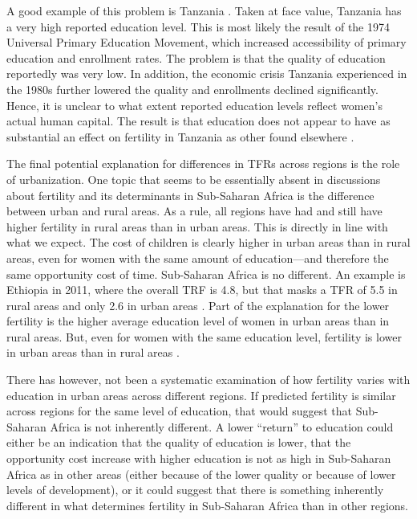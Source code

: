 \documentclass[letterpaper,12pt]{article}
\begin{document}
A good example of this problem is Tanzania
\citep{Galabawa2001,Wedgwood2005}. 
Taken at face value, Tanzania has a very high reported education level. 
This is most likely the result of the 1974 Universal Primary Education
Movement, which increased accessibility of primary education and
enrollment rates. 
The problem is that the quality of education reportedly was very low. 
In addition, the economic crisis Tanzania experienced in the 1980s
further lowered the quality and enrollments declined significantly. 
Hence, it is unclear to what extent reported education levels reflect
women's actual human capital. 
The result is that education does not appear to have as substantial an
effect on fertility in Tanzania as other found elsewhere
\citep{Alam2016}.

The final potential explanation for differences in TFRs across regions
is the role of urbanization. 
One topic that seems to be essentially absent in discussions about
fertility and its determinants in Sub-Saharan Africa is the difference
between urban and rural areas. 
As a rule, all regions have had and still have higher fertility in rural
areas than in urban areas. 
This is directly in line with what we expect. 
The cost of children is clearly higher in urban areas than in rural
areas, even for women with the same amount of education---and therefore
the same opportunity cost of time. 
Sub-Saharan Africa is no different. 
An example is Ethiopia in 2011, where the overall TRF is 4.8, but that
masks a TFR of 5.5 in rural areas and only 2.6 in urban areas
\citep{Central-Statistical-Agency/Ethiopia2012}. 
Part of the explanation for the lower fertility is the higher average
education level of women in urban areas than in rural areas. 
But, even for women with the same education level, fertility is lower in
urban areas than in rural areas \citep{Ainsworth1996}.

There has however, not been a systematic examination of how fertility
varies with education in urban areas across different regions. 
If predicted fertility is similar across regions for the same level of
education, that would suggest that Sub-Saharan Africa is not inherently
different. 
A lower ``return'' to education could either be an indication that the
quality of education is lower, that the opportunity cost increase with
higher education is not as high in Sub-Saharan Africa as in other areas
(either because of the lower quality or because of lower levels of
development), or it could suggest that there is something inherently
different in what determines fertility in Sub-Saharan Africa than in
other regions.
\end{document}
